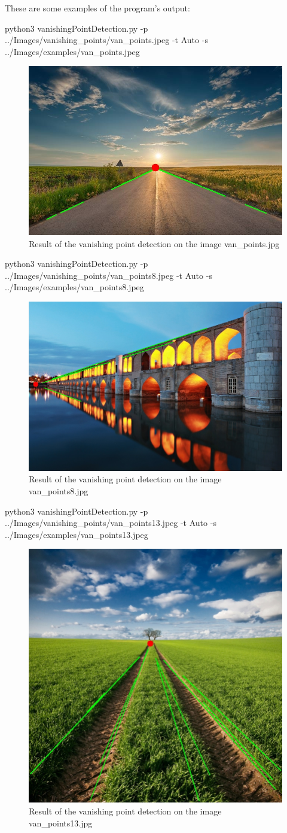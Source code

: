 These are some examples of the program's output:

\begin{bashscript}
    python3 vanishingPointDetection.py -p ../Images/vanishing_points/van_points.jpeg -t Auto -s ../Images/examples/van_points.jpeg
\end{bashscript}

\begin{figure}[H]
    \centering
    \includegraphics[width=0.4\columnwidth]{../Images/examples/van_points.jpg}
    \caption{Result of the vanishing point detection on the image van\_points.jpg}
    \label{fig-6}
\end{figure}


\begin{bashscript}
    python3 vanishingPointDetection.py -p ../Images/vanishing_points/van_points8.jpeg -t Auto -s ../Images/examples/van_points8.jpeg
\end{bashscript}

\begin{figure}[H]
    \centering
    \includegraphics[width=0.4\columnwidth]{../Images/examples/van_points8.jpg}
    \caption{Result of the vanishing point detection on the image van\_points8.jpg}
    \label{fig-7}
\end{figure}


\begin{bashscript}
    python3 vanishingPointDetection.py -p ../Images/vanishing_points/van_points13.jpeg -t Auto -s ../Images/examples/van_points13.jpeg
\end{bashscript}

\begin{figure}[H]
    \centering
    \includegraphics[width=0.4\columnwidth]{../Images/examples/van_points13.jpg}
    \caption{Result of the vanishing point detection on the image van\_points13.jpg}
    \label{fig-8}
\end{figure}

